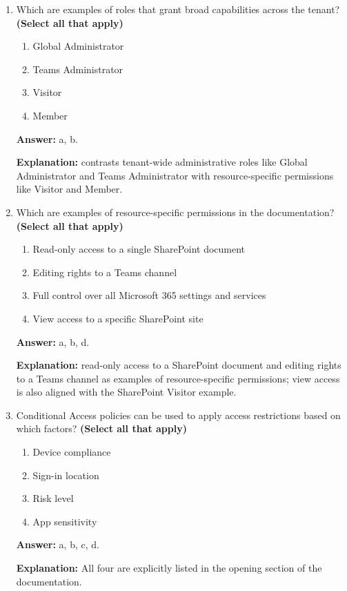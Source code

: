 \documentclass[10pt]{article}
\begin{document}
\begin{enumerate}[leftmargin=*]
\textbf{Explanation:} explicitly describes access and permissions in Microsoft 365 as layered and flexible.

\item Which are examples of roles that grant broad capabilities across the tenant? \textbf{(Select all that apply)}
\begin{enumerate}[label=\alph*., leftmargin=1.5em]
\item Global Administrator
\item Teams Administrator
\item Visitor
\item Member
\end{enumerate}
\textbf{Answer:} a, b.

\textbf{Explanation:} contrasts tenant-wide administrative roles like Global Administrator and Teams Administrator with resource-specific permissions like Visitor and Member.

\item Which are examples of resource-specific permissions in the documentation? \textbf{(Select all that apply)}
\begin{enumerate}[label=\alph*., leftmargin=1.5em]
\item Read-only access to a single SharePoint document
\item Editing rights to a Teams channel
\item Full control over all Microsoft 365 settings and services
\item View access to a specific SharePoint site
\end{enumerate}
\textbf{Answer:} a, b, d.

\textbf{Explanation:} read-only access to a SharePoint document and editing rights to a Teams channel as examples of resource-specific permissions; view access is also aligned with the SharePoint Visitor example.

\item Conditional Access policies can be used to apply access restrictions based on which factors? \textbf{(Select all that apply)}
\begin{enumerate}[label=\alph*., leftmargin=1.5em]
\item Device compliance
\item Sign-in location
\item Risk level
\item App sensitivity
\end{enumerate}
\textbf{Answer:} a, b, c, d.

\textbf{Explanation:} All four are explicitly listed in the opening section of the documentation.


\end{enumerate}
\end{document}

